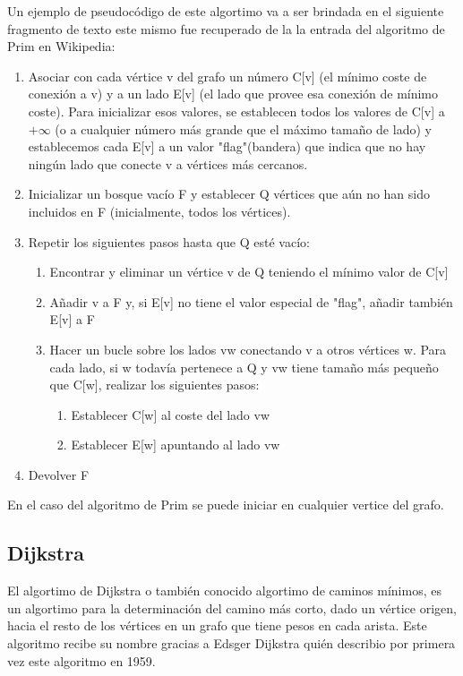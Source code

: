 \documentclass[10pt,a4paper]{article}
\begin{document}
	
	Un ejemplo de pseudocódigo de este algortimo va a ser brindada en el siguiente fragmento de texto este mismo fue recuperado de la la entrada del algoritmo de Prim en Wikipedia:
\begin{enumerate}
\item Asociar con cada vértice v del grafo un número C[v] (el mínimo coste de conexión a v) y a un lado E[v] (el lado que provee esa conexión de mínimo coste). Para inicializar esos valores, se establecen todos los valores de C[v] a $+\infty$ (o a cualquier número más grande que el máximo tamaño de lado) y establecemos cada E[v] a un valor "flag"(bandera) que indica que no hay ningún lado que conecte v a vértices más cercanos.
\item Inicializar un bosque vacío F y establecer Q vértices que aún no han sido incluidos en F (inicialmente, todos los vértices).
\item Repetir los siguientes pasos hasta que Q esté vacío:
\begin{enumerate}
\item Encontrar y eliminar un vértice v de Q teniendo el mínimo valor de C[v]
\item Añadir v a F y, si E[v] no tiene el valor especial de "flag", añadir también E[v] a F
\item Hacer un bucle sobre los lados vw conectando v a otros vértices w. Para cada lado, si w todavía pertenece a Q y vw tiene tamaño más pequeño que C[w], realizar los siguientes pasos:
\begin{enumerate}
\item Establecer C[w] al coste del lado vw
\item Establecer E[w] apuntando al lado vw
\end{enumerate}
\end{enumerate}
\item Devolver F
\end{enumerate}
En el caso del algoritmo de Prim se puede iniciar en cualquier vertice del grafo.\\
\subsection{Dijkstra}
	El algortimo de Dijkstra o también conocido algortimo de caminos mínimos, es un algortimo para la determinación del camino más corto, dado un vértice origen, hacia el resto de los vértices en un grafo que tiene pesos en cada arista. Este algoritmo recibe su nombre gracias a Edsger Dijkstra quién describio por primera vez este algoritmo en 1959.\cite{Dijkstra}\\
	
\end{document}
